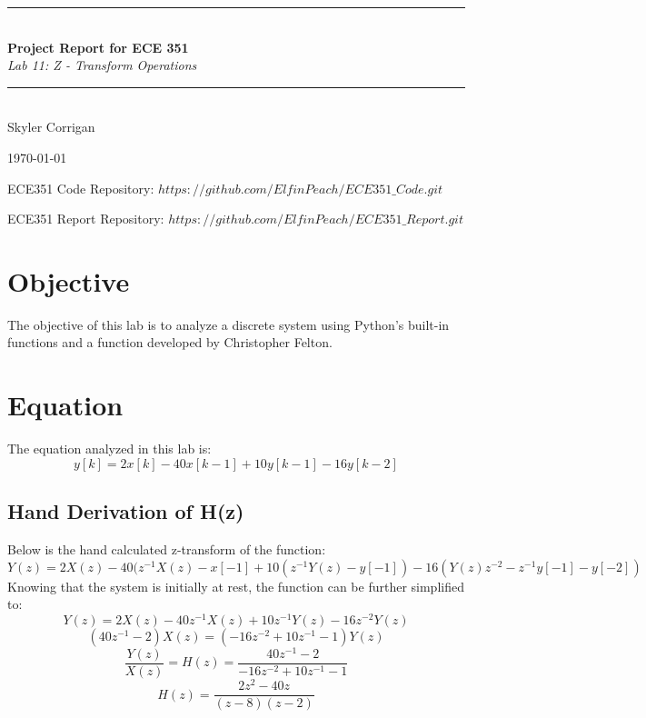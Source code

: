 \documentclass[12pt,a4paper]{article}
\newcommand{\HRule}{\rule{\linewidth}{0.5mm}}
\begin{document}
\begin{titlepage}
\begin{center}

\HRule \\[0.4cm]
{ \LARGE 
  \textbf{Project Report for ECE 351}\\[0.4cm]
  \emph{Lab 11: Z - Transform Operations}\\[0.4cm]
}
\HRule \\[1.5cm]


{ \large
  Skyler Corrigan \\[0.1cm]
}

\vfill

{\large \today}

{ \large
ECE351 Code Repository: 
\hyperlink{$https://github.com/ElfinPeach/ECE351\_Code.git$}{$https://github.com/ElfinPeach/ECE351\_Code.git$}

ECE351 Report Repository: 
\hyperlink{$https://github.com/ElfinPeach/ECE351\_Report.git$}{$https://github.com/ElfinPeach/ECE351\_Report.git$}
}
 
\end{center}
\end{titlepage}

\newpage

\tableofcontents
{}
\newpage
\setcounter{page}{1}

\section{Objective}
The objective of this lab is to analyze a discrete system using Python’s built-in functions and a function developed by Christopher Felton.
\section{Equation}
The equation analyzed in this lab is:
    $$y[k]=2x[k]-40x[k-1]+10y[k-1]-16y[k-2]$$
\subsection{Hand Derivation of H(z)}
Below is the hand calculated z-transform of the function:
$$Y(z)=2X(z)-40(z^{-1}X(z)-x[-1]+10(z^{-1}Y(z)-y[-1])-16(Y(z)z^{-2}-z^{-1}y[-1]-y[-2])$$
Knowing that the system is initially at rest, the function can be further simplified to:
$$Y(z)=2X(z)-40z^{-1}X(z)+10z^{-1}Y(z)-16z^{-2}Y(z)$$
$$(40z^{-1}-2)X(z)=(-16z^{-2}+10z^{-1}-1)Y(z)$$
$$\frac{Y(z)}{X(z)}=H(z)=\frac{40z^{-1}-2}{-16z^{-2}+10z^{-1}-1}$$
$$H(z)=\frac{2z^2-40z}{(z-8)(z-2)}$$
\end{document}
